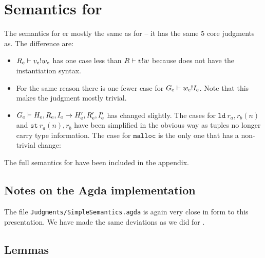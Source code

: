 \section{Semantics for \ATALe}

The semantics for \ATALe er mostly the same as for \ATAL -- it has the same 5
core judgments as. The difference are:

\begin{itemize}
\item ${R_{\mathrm{e}}} |- {v_{\mathrm{e}}} ! {w_{\mathrm{e}}}$ has one case less than
  ${R} |- {v} ! {w}$ because \ATALe does not have the
  instantiation syntax.
\item For the same reason there is one fewer case for
  ${G_{\mathrm{e}}} |- {w_{\mathrm{e}}} ! {I_{\mathrm{e}}}$. Note that this makes the
  judgment mostly trivial.
\item
  ${G_{\mathrm{e}}} |- {H_{\mathrm{e}}, R_{\mathrm{e}}, I_{\mathrm{e}}} -> {H_{\mathrm{e}}', R_{\mathrm{e}}',
    I_{\mathrm{e}}'}$ has changed slightly. The cases for $\mathtt{ld}\ r_a, r_b(n)$
  and $\mathtt{st}\ r_a(n), r_b$ have been simplified in the obvious way as
  tuples no longer carry type information. The case for $\mathtt{malloc}$ is the
  only one that has a non-trivial change:
\end{itemize}


The full semantics for \ATALe have been included in the appendix.

\subsection{Notes on the Agda implementation}

The file \texttt{Judgments/SimpleSemantics.agda} is again very close in form to
this presentation. We have made the same deviations as we did for \ATAL.

\subsection{Lemmas}


